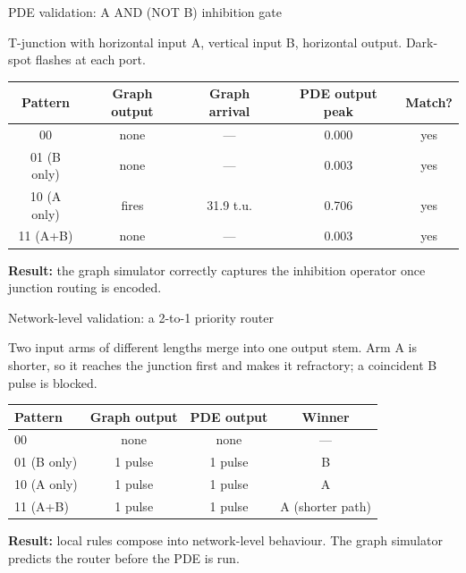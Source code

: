 \documentclass[aspectratio=169,11pt]{beamer}
\begin{document}
\begin{frame}{PDE validation: A AND (NOT B) inhibition gate}

T-junction with horizontal input A, vertical input B, horizontal output. Dark-spot flashes at each port.

\vspace{0.3cm}
\begin{table}
\centering
\footnotesize
\begin{tabular}{ccccc}
\toprule
\textbf{Pattern} & \textbf{Graph output} & \textbf{Graph arrival} & \textbf{PDE output peak} & \textbf{Match?} \\
\midrule
00 & none & — & 0.000 & yes \\
01 (B only) & none & — & 0.003 & yes \\
10 (A only) & fires & 31.9 t.u. & 0.706 & yes \\
11 (A+B) & none & — & 0.003 & yes \\
\bottomrule
\end{tabular}
\end{table}

\vspace{0.3cm}
\textbf{Result:} the graph simulator correctly captures the inhibition operator once junction routing is encoded.

\end{frame}

\begin{frame}{Network-level validation: a 2-to-1 priority router}

Two input arms of different lengths merge into one output stem. Arm A is shorter, so it reaches the junction first and makes it refractory; a coincident B pulse is blocked.

\vspace{0.3cm}
\begin{table}
\centering
\footnotesize
\begin{tabular}{lccc}
\toprule
\textbf{Pattern} & \textbf{Graph output} & \textbf{PDE output} & \textbf{Winner} \\
\midrule
00 & none & none & — \\
01 (B only) & 1 pulse & 1 pulse & B \\
10 (A only) & 1 pulse & 1 pulse & A \\
11 (A+B) & 1 pulse & 1 pulse & A (shorter path) \\
\bottomrule
\end{tabular}
\end{table}

\vspace{0.3cm}
\textbf{Result:} local rules compose into network-level behaviour. The graph simulator predicts the router before the PDE is run.

\end{frame}
\end{document}
